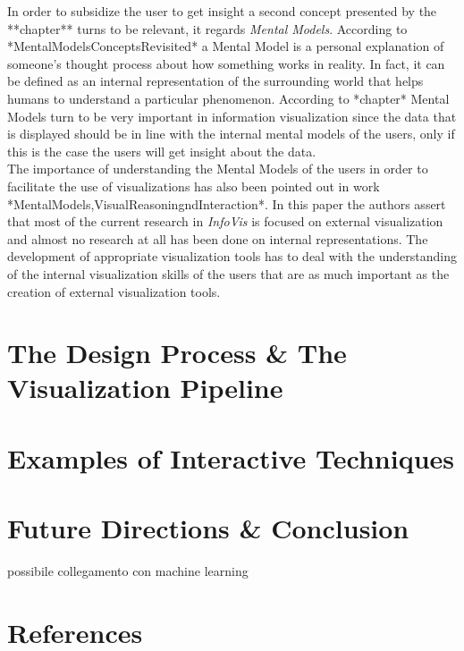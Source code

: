 \documentclass[10p,letterpaper]{article}
\begin{document}
In order to subsidize the user to get insight a second concept presented by the **chapter** turns to be relevant, it regards \textit{Mental Models}. According to *MentalModelsConceptsRevisited* a Mental Model is a personal explanation of someone's thought process about how something works in reality. In fact, it can be defined as an internal representation of the surrounding world that helps humans to understand a particular phenomenon. According to *chapter* Mental Models turn to be very important in information visualization since the data that is displayed should be in line with the internal mental models of the users, only if this is the case the users will get insight about the data.\\
The importance of understanding the Mental Models of the users in order to facilitate the use of visualizations has also been pointed out in work *MentalModels,VisualReasoningndInteraction*. In this paper the authors assert that most of the current research in \textit{InfoVis} is focused on external visualization and almost no research at all has been done on internal representations. The development of appropriate visualization tools has to deal with the understanding of the internal visualization skills of the users that are as much important as the creation of external visualization tools.\\
 	
\section{The Design Process \& The Visualization Pipeline}

\section{Examples of Interactive Techniques}

\section{Future Directions \& Conclusion}
possibile collegamento con machine learning

\section{References}

\nocite{ChalnickBillman1988a}




\setlength{\bibleftmargin}{.125in}
\setlength{\bibindent}{-\bibleftmargin}


\end{document}
